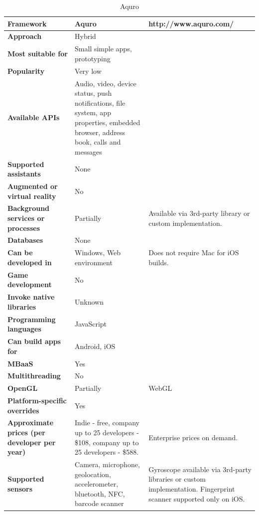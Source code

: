 \documentclass[english,master,public,dept460,male,cpdeclaration,oneside]{diploma}
\begin{document}
\begin{table}[!h]
	\centering
	\caption{Aquro}
	\begin{tabular}{p{} | p{} | p{}}
		\toprule		
		\textbf{Framework} & \textbf{Aquro} & http://www.aquro.com/ \\
		\midrule
		\textbf{Approach} & Hybrid & \\			
		\midrule	
		\textbf{Most suitable for} & Small simple apps, prototyping & \\
		\midrule
		\textbf{Popularity} & Very low & \\			
		\midrule
		\textbf{Available APIs} & Audio, video, device status, push notifications, file system, app properties, embedded browser, address book, calls and messages & \\			
		\midrule
		\textbf{Supported assistants} & None & \\			
		\midrule
		\textbf{Augmented or virtual reality} & No & \\			
		\midrule
		\textbf{Background services or processes} & Partially & Available via 3rd-party library or custom implementation. \\			
		\midrule
		\textbf{Databases} & None & \\			
		\midrule
		\textbf{Can be developed in} & Windows, Web environment & Does not require Mac for iOS builds. \\			
		\midrule
		\textbf{Game development} & No & \\			
		\midrule
		\textbf{Invoke native libraries} & Unknown & \\			
		\midrule
		\textbf{Programming languages} & JavaScript & \\			
		\midrule
		\textbf{Can build apps for} & Android, iOS & \\			
		\midrule
		\textbf{MBaaS} & Yes & \\			
		\midrule
		\textbf{Multithreading} & No & \\			
		\midrule
		\textbf{OpenGL} & Partially & WebGL \\			
		\midrule
		\textbf{Platform-specific overrides} & Yes & \\			
		\midrule
		\textbf{Approximate prices (per developer per year)} & Indie - free, company up to 25 developers - \$108, company up to 25 developers - \$588. & Enterprise prices on demand. \\			
		\midrule
		\textbf{Supported sensors} & Camera, microphone, geolocation, accelerometer, bluetooth, NFC, barcode scanner & Gyroscope available via 3rd-party libraries or custom implementation. Fingerprint scanner supported only on iOS.\\			
		\midrule
	\end{tabular}
\end{table}
\end{document}
